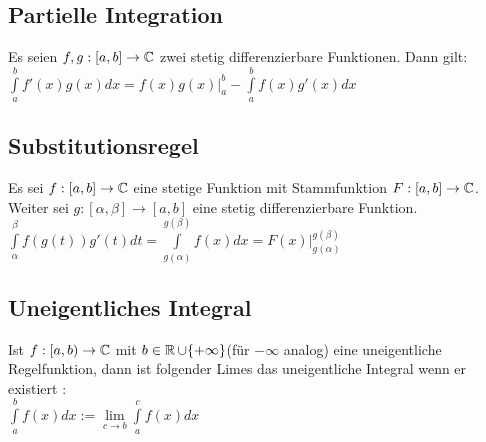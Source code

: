 \documentclass[german]{latex4ei/latex4ei_sheet}
\begin{document}
\begin{sectionbox}
	\subsection{Partielle Integration}
	Es seien $f,g : [a,b] \rightarrow \mathbb C$ zwei stetig differenzierbare Funktionen. Dann gilt:\\
$	\int \limits_a^b f'(x)g(x)dx = \left.f(x)g(x) \right|_a^b - \int \limits_a^b f(x)g'(x)dx$

\end{sectionbox}

\begin{sectionbox}
	\subsection{Substitutionsregel}
	Es sei $f : [a,b] \rightarrow \mathbb C$ eine stetige Funktion mit Stammfunktion $F : [a,b] \rightarrow \mathbb C$. Weiter sei $g : [\alpha,\beta] \rightarrow [a,b]$ eine stetig differenzierbare Funktion.\\
	$\int \limits_\alpha^\beta f(g(t))g'(t)dt = \int \limits_{g(\alpha)}^{g(\beta)} f(x)dx = \left.F(x) \right|_{g(\alpha)}^{g(\beta)} $



\end{sectionbox}

\begin{sectionbox}
	\subsection{Uneigentliches Integral}
	Ist $f : [a,b) \rightarrow \mathbb C$ mit $b \in  \operatorname{\mathbb R} \cup \{+ \infty\}$(für $-\infty$ analog) eine uneigentliche Regelfunktion,  dann ist folgender Limes das uneigentliche Integral wenn er existiert :\\
	$\int \limits_a^b f(x)dx := \lim \limits_{c \to b} \int \limits_a^c f(x)dx$


\end{sectionbox}
\end{document}
